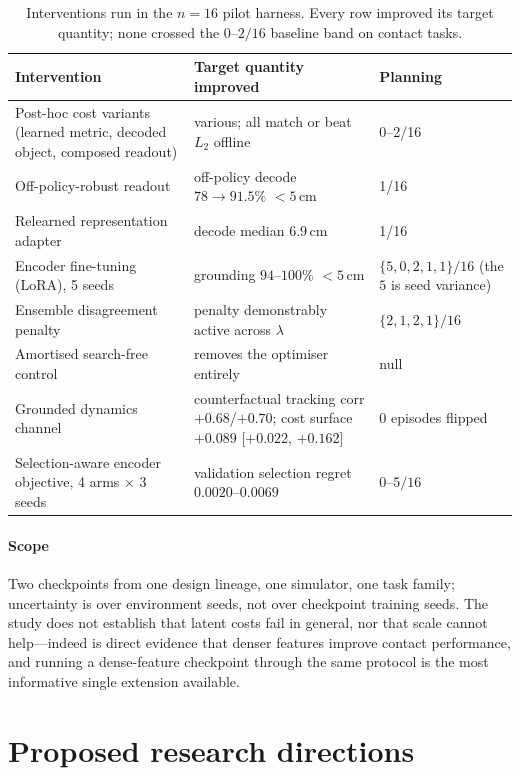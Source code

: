 \documentclass[11pt,letterpaper]{article}
\begin{document}
\begin{table}[t]
\centering\footnotesize
\caption{Interventions run in the $n{=}16$ pilot harness. Every row improved
its target quantity; none crossed the $0$--$2/16$ baseline band on contact
tasks.}\label{tab:nulls}
\begin{tabularx}{\textwidth}{@{}L{4.3cm} L{5.7cm} Y@{}}
\toprule
Intervention & Target quantity improved & Planning \\
\midrule
Post-hoc cost variants (learned metric, decoded object, composed readout) &
various; all match or beat $L_2$ offline & 0--2/16 \\
Off-policy-robust readout & off-policy decode $78 \rightarrow 91.5\%$ $<5$\,cm &
1/16 \\
Relearned representation adapter & decode median $6.9$\,cm & 1/16 \\
Encoder fine-tuning (LoRA), 5 seeds & grounding $94$--$100\%$ $<5$\,cm &
$\{5,0,2,1,1\}/16$ (the $5$ is seed variance) \\
Ensemble disagreement penalty & penalty demonstrably active across $\lambda$ &
$\{2,1,2,1\}/16$ \\
Amortised search-free control & removes the optimiser entirely & null \\
Grounded dynamics channel & counterfactual tracking corr $+0.68$/$+0.70$; cost
surface $+0.089$ [$+0.022$, $+0.162$] & 0 episodes flipped \\
Selection-aware encoder objective, 4 arms $\times$ 3 seeds & validation selection
regret $0.0020$--$0.0069$ & $0$--$5/16$ \\
\bottomrule
\end{tabularx}
\end{table}

\paragraph{Scope}
Two checkpoints from one design lineage, one simulator, one task family;
uncertainty is over environment seeds, not over checkpoint training seeds. The
study does not establish that latent costs fail in general, nor that scale cannot
help---indeed \citet{murlabadia2026vjepa21} is direct evidence that denser
features improve contact performance, and running a dense-feature checkpoint
through the same protocol is the most informative single extension available.

\section{Proposed research directions}\label{sec:open}
\end{document}
